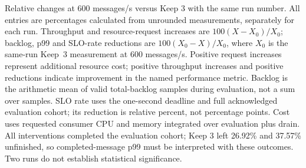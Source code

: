 \begin{table}[!htbp]
\caption{Relative changes at 600 messages/s versus Keep 3 with the same run number. All entries are percentages calculated from unrounded measurements, separately for each run. Throughput and resource-request increases are $100(X-X_0)/X_0$; backlog, p99 and SLO-rate reductions are $100(X_0-X)/X_0$, where $X_0$ is the same-run Keep~3 measurement at 600 messages/s. Positive request increases represent additional resource cost; positive throughput increases and positive reductions indicate improvement in the named performance metric. Backlog is the arithmetic mean of valid total-backlog samples during evaluation, not a sum over samples. SLO rate uses the one-second deadline and full acknowledged evaluation cohort; its reduction is relative percent, not percentage points. Cost uses requested consumer CPU and memory integrated over evaluation plus drain. All interventions completed the evaluation cohort; Keep 3 left 26.92\% and 37.57\% unfinished, so completed-message p99 must be interpreted with these outcomes. Two runs do not establish statistical significance.}
\label{tab:four-partition-relative-improvement}
\end{table}
